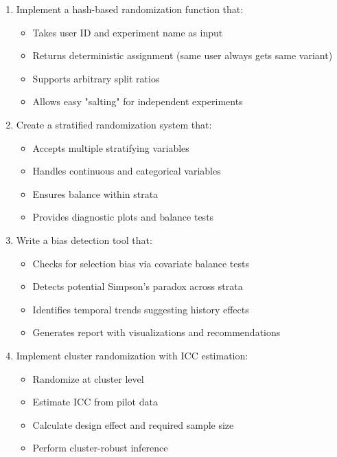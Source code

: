 \begin{enumerate}
    \item Implement a hash-based randomization function that:
    \begin{itemize}
        \item Takes user ID and experiment name as input
        \item Returns deterministic assignment (same user always gets same variant)
        \item Supports arbitrary split ratios
        \item Allows easy "salting" for independent experiments
    \end{itemize}

    \item Create a stratified randomization system that:
    \begin{itemize}
        \item Accepts multiple stratifying variables
        \item Handles continuous and categorical variables
        \item Ensures balance within strata
        \item Provides diagnostic plots and balance tests
    \end{itemize}

    \item Write a bias detection tool that:
    \begin{itemize}
        \item Checks for selection bias via covariate balance tests
        \item Detects potential Simpson's paradox across strata
        \item Identifies temporal trends suggesting history effects
        \item Generates report with visualizations and recommendations
    \end{itemize}

    \item Implement cluster randomization with ICC estimation:
    \begin{itemize}
        \item Randomize at cluster level
        \item Estimate ICC from pilot data
        \item Calculate design effect and required sample size
        \item Perform cluster-robust inference
    \end{itemize}
\end{enumerate}

